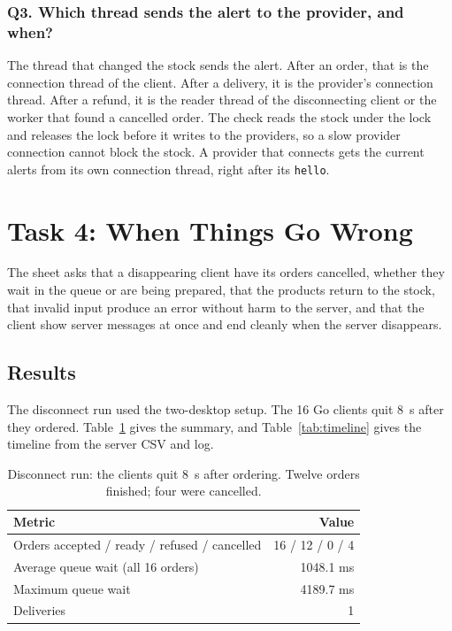 \documentclass[12pt,a4paper]{article}
\begin{document}
    \subsubsection{Q3. Which thread sends the alert to the provider, and when?}
    The thread that changed the stock sends the alert. After an order, that is the
    connection thread of the client. After a delivery, it is the provider's connection
    thread. After a refund, it is the reader thread of the disconnecting client or the
    worker that found a cancelled order. The check reads the stock under the lock and
    releases the lock before it writes to the providers, so a slow provider connection
    cannot block the stock. A provider that connects gets the current alerts from its
    own connection thread, right after its \texttt{hello}.

\section{Task 4: When Things Go Wrong}
\label{sec:task4}

The sheet asks that a disappearing client have its orders cancelled, whether they
wait in the queue or are being prepared, that the products return to the stock, that
invalid input produce an error without harm to the server, and that the client show
server messages at once and end cleanly when the server disappears.

\subsection{Results}

The disconnect run used the two-desktop setup. The 16 Go clients quit 8~s after they
ordered. Table~\ref{tab:cancel} gives the summary, and Table~\ref{tab:timeline} gives
the timeline from the server CSV and log.

\begin{table}[H]
\centering
\small
\begin{tabularx}{\textwidth}{@{}X r@{}}
\toprule
Metric & Value \\
\midrule
Orders accepted / ready / refused / cancelled & 16 / 12 / 0 / 4 \\
Average queue wait (all 16 orders) & 1048.1 ms \\
Maximum queue wait & 4189.7 ms \\
Deliveries & 1 \\
\bottomrule
\end{tabularx}
\caption{Disconnect run: the clients quit 8~s after ordering. Twelve orders finished; four were cancelled.}
\label{tab:cancel}
\end{table}
\end{document}
